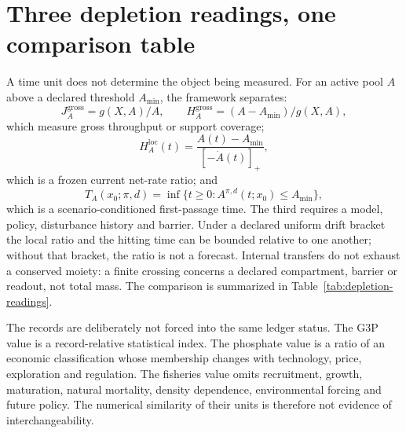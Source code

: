 \documentclass[11pt]{article}
\begin{document}
\section{Three depletion readings, one comparison table}
A time unit does not determine the object being measured. For an active pool \(A\) above a declared threshold \(A_{\min}\), the framework separates:
\[J_A^{\mathrm{gross}}=g(X,A)/A,\qquad H_A^{\mathrm{gross}}=(A-A_{\min})/g(X,A),\]
which measure gross throughput or support coverage;
\[H_A^{\mathrm{loc}}(t)=\frac{A(t)-A_{\min}}{[-\dot A(t)]_+},\]
which is a frozen current net-rate ratio; and
\[T_A(x_0;\pi,d)=\inf\{t\ge0:A^{\pi,d}(t;x_0)\le A_{\min}\},\]
which is a scenario-conditioned first-passage time. The third requires a model, policy, disturbance history and barrier. Under a declared uniform drift bracket the local ratio and the hitting time can be bounded relative to one another; without that bracket, the ratio is not a forecast. Internal transfers do not exhaust a conserved moiety: a finite crossing concerns a declared compartment, barrier or readout, not total mass.
The comparison is summarized in Table~\ref{tab:depletion-readings}.

The records are deliberately not forced into the same ledger status. The G3P value is a record-relative statistical index. The phosphate value is a ratio of an economic classification whose membership changes with technology, price, exploration and regulation. The fisheries value omits recruitment, growth, maturation, natural mortality, density dependence, environmental forcing and future policy. The numerical similarity of their units is therefore not evidence of interchangeability.
\end{document}
